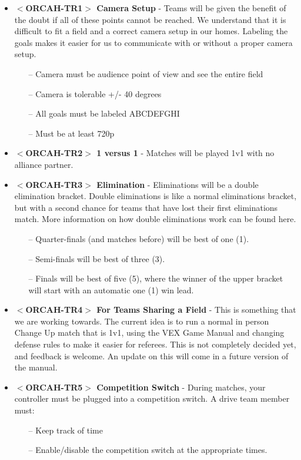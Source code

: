 \documentclass[letterpaper, 12pt]{article}
\begin{document}
\begin{itemize}[label={}]
\item\textbf{$<$ORCAH-TR1$>$ Camera Setup} - Teams will be given the benefit of the doubt if all of these points cannot be reached.  We understand that it is difficult to fit a field and a correct camera setup in our homes.  Labeling the goals makes it easier for us to communicate with or without a proper camera setup.
\begin{itemize}
\item[--] Camera must be audience point of view and see the entire field
\item[--] Camera is tolerable +/- 40 degrees
\item[--] All goals must be labeled ABCDEFGHI
\item[--] Must be at least 720p
\end{itemize}

\item\textbf{$<$ORCAH-TR2$>$ 1 versus 1} - Matches will be played 1v1 with no alliance partner. 

\item\textbf{$<$ORCAH-TR3$>$ Elimination} - Eliminations will be a double elimination bracket.  Double eliminations is like a normal eliminations bracket, but with a second chance for teams that have lost their first eliminations match.  More information on how double eliminations work can be found here. 

\begin{itemize}
\item[--] Quarter-finals (and matches before) will be best of one (1).
\item[--] Semi-finals will be best of three (3).
\item[--] Finals will be best of five (5), where the winner of the upper bracket will start with an automatic one (1) win lead.
\end{itemize}

\item\textbf{$<$ORCAH-TR4$>$ For Teams Sharing a Field} - This is something that we are working towards.  The current idea is to run a normal in person Change Up match that is 1v1, using the VEX Game Manual and changing defense rules to make it easier for referees.  This is not completely decided yet, and feedback is welcome.  An update on this will come in a future version of the manual.

\item\textbf{$<$ORCAH-TR5$>$ Competition Switch} - During matches, your controller must be plugged into a competition switch.  A drive team member must:
\begin{itemize}
\item[--] Keep track of time
\item[--] Enable/disable the competition switch at the appropriate times.
\end{itemize}


\end{itemize}
\end{document}
